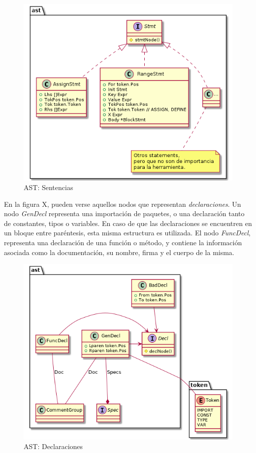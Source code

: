 \begin{figure}[H]
  \includegraphics[width=12cm]{implementation/ast_statements.png}
  \centering
  \caption{AST: Sentencias}
\end{figure}

En la figura X, pueden verse aquellos nodos que representan \textit{declaraciones}.
Un nodo \textit{GenDecl} representa una importación de paquetes, o una declaración tanto de
constantes, tipos o variables.
En caso de que las declaraciones se encuentren en un bloque entre paréntesis, esta misma
estructura es utilizada.
El nodo \textit{FuncDecl}, representa una declaración de una función o método, y contiene
la información asociada como la documentación, su nombre, firma y el cuerpo de la misma.

\begin{figure}[H]
  \includegraphics[width=12cm]{implementation/ast_decls.png}
  \centering
  \caption{AST: Declaraciones}
\end{figure}

